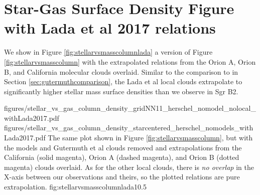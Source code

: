 \documentclass[twocolumn]{aastex61}
\begin{document}
\section{Star-Gas Surface Density Figure with Lada et al 2017 relations}
\label{sec:ladasurfdensappendix}
We show in Figure \ref{fig:stellarvsmasscolumnlada} a version of Figure
\ref{fig:stellarvsmasscolumn} with the extrapolated relations from the Orion A,
Orion B, and California molecular clouds overlaid.  Similar to the comparison
to \citet{Gutermuth2011a} in Section \ref{sec:gutermuthcomparison}, the Lada et
al local clouds extrapolate to significantly higher stellar mass surface
densities than we observe in Sgr B2.

\FigureTwo
{figures/stellar_vs_gas_column_density_gridNN11_herschel_nomodel_nolocal_withLada2017.pdf}
{figures/stellar_vs_gas_column_density_starcentered_herschel_nomodels_withLada2017.pdf}
{The same plot shown in Figure \ref{fig:stellarvsmasscolumn},
but with the models and Gutermuth et al clouds removed and extrapolations
from the California (solid magenta), Orion A (dashed magenta), and Orion B
(dotted magenta) clouds overlaid.  As for the other local clouds, there is
\emph{no overlap} in the X-axis between our observations and theirs, so the
plotted relations are pure extrapolation.}
{fig:stellarvsmasscolumnlada}{1}{0.5\textwidth}
\end{document}
